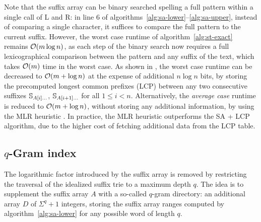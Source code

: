 Note that the suffix array can be binary searched spelling a full pattern within a single call of \textsc{L} and \textsc{R}: in line 6 of algorithms~\ref{alg:sa-lower}--\ref{alg:sa-upper}, instead of comparing a single character, it suffices to compare the full pattern to the current suffix.
However, the worst case runtime of algorithm~\ref{alg:st-exact} remains $\mathcal{O}(m \log{n})$, as each step of the binary search now requires a full lexicographical comparison between the pattern and any suffix of the text, which takes $\mathcal{O}(m)$ time in the worst case.
As shown in \citep{Manber1990}, the worst case runtime can be decreased to $\mathcal{O}(m + \log{n})$ at the expense of additional $n \log{n}$ bits, by storing the precomputed longest common prefixes (LCP) between any two consecutive suffixes $\mathbb {S}_{A[i] \dots}$, $\mathbb {S}_{A[i+1] \dots}$ for all $1 \leq i < n$.
Alternatively, the \emph{average case} runtime is reduced to $\mathcal{O}(m + \log{n})$, without storing any additional information, by using the MLR heuristic \citep{Manber1990}.
In practice, the MLR heuristic outperforms the SA + LCP algorithm, due to the higher cost of fetching additional data from the LCP table.


\subsection{$q$-Gram index}
\label{sec:index:qgram}

The logarithmic factor introduced by the suffix array is removed by restricting the traversal of the idealized suffix trie to a maximum depth $q$.
The idea is to supplement the suffix array $A$ with a so-called $q$-gram directory: an additional array $D$ of $\Sigma^q + 1$ integers, storing the suffix array ranges computed by algorithm~\ref{alg:sa-lower} for any possible word of length $q$.


